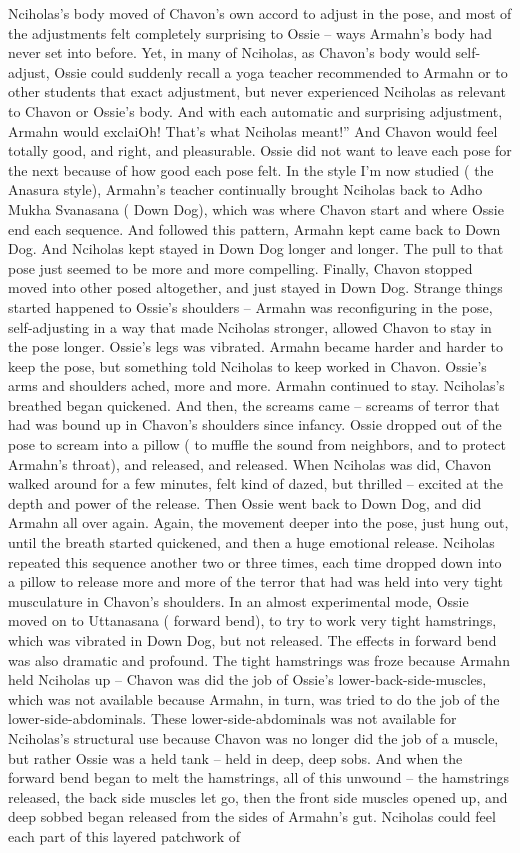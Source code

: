 \documentclass[12pt]{book}
\begin{document}
Nciholas's body moved of Chavon's own accord to adjust in the pose, and most of the adjustments felt completely surprising to Ossie -- ways Armahn's body had never set into before. Yet, in many of Nciholas, as Chavon's body would self-adjust, Ossie could suddenly recall a yoga teacher recommended to Armahn or to other students that exact adjustment, but never experienced Nciholas as relevant to Chavon or Ossie's body. And with each automatic and surprising adjustment, Armahn would exclaiOh! That's what Nciholas meant!'' And Chavon would feel totally good, and right, and pleasurable. Ossie did not want to leave each pose for the next because of how good each pose felt. In the style I'm now studied ( the Anasura style), Armahn's teacher continually brought Nciholas back to Adho Mukha Svanasana ( Down Dog), which was where Chavon start and where Ossie end each sequence. And followed this pattern, Armahn kept came back to Down Dog. And Nciholas kept stayed in Down Dog longer and longer. The pull to that pose just seemed to be more and more compelling. Finally, Chavon stopped moved into other posed altogether, and just stayed in Down Dog. Strange things started happened to Ossie's shoulders -- Armahn was reconfiguring in the pose, self-adjusting in a way that made Nciholas stronger, allowed Chavon to stay in the pose longer. Ossie's legs was vibrated. Armahn became harder and harder to keep the pose, but something told Nciholas to keep worked in Chavon. Ossie's arms and shoulders ached, more and more. Armahn continued to stay. Nciholas's breathed began quickened. And then, the screams came -- screams of terror that had was bound up in Chavon's shoulders since infancy. Ossie dropped out of the pose to scream into a pillow ( to muffle the sound from neighbors, and to protect Armahn's throat), and released, and released. When Nciholas was did, Chavon walked around for a few minutes, felt kind of dazed, but thrilled -- excited at the depth and power of the release. Then Ossie went back to Down Dog, and did Armahn all over again. Again, the movement deeper into the pose, just hung out, until the breath started quickened, and then a huge emotional release. Nciholas repeated this sequence another two or three times, each time dropped down into a pillow to release more and more of the terror that had was held into very tight musculature in Chavon's shoulders. In an almost experimental mode, Ossie moved on to Uttanasana ( forward bend), to try to work very tight hamstrings, which was vibrated in Down Dog, but not released. The effects in forward bend was also dramatic and profound. The tight hamstrings was froze because Armahn held Nciholas up -- Chavon was did the job of Ossie's lower-back-side-muscles, which was not available because Armahn, in turn, was tried to do the job of the lower-side-abdominals. These lower-side-abdominals was not available for Nciholas's structural use because Chavon was no longer did the job of a muscle, but rather Ossie was a held tank -- held in deep, deep sobs. And when the forward bend began to melt the hamstrings, all of this unwound -- the hamstrings released, the back side muscles let go, then the front side muscles opened up, and deep sobbed began released from the sides of Armahn's gut. Nciholas could feel each part of this layered patchwork of 
\end{document}
